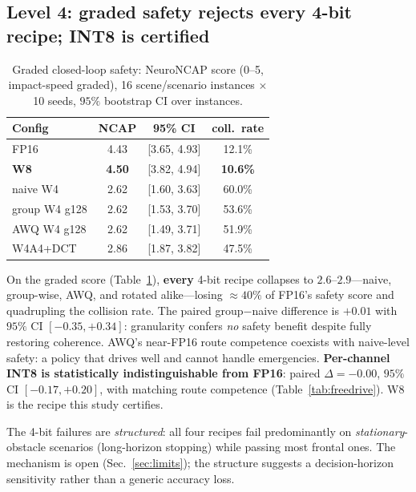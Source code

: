 \documentclass[conference]{IEEEtran}
\begin{document}
\subsection{Level 4: graded safety rejects every 4-bit recipe; INT8 is certified}
\label{sec:safety}
\begin{table}[t]\centering
\caption{Graded closed-loop safety: NeuroNCAP score (0--5, impact-speed graded), 16
scene/scenario instances $\times$ 10 seeds, $95\%$ bootstrap CI over instances.}
\label{tab:safety}
\begin{tabular}{lccc}
\toprule
Config & NCAP & 95\% CI & coll.\ rate \\
\midrule
FP16              & 4.43 & [3.65, 4.93] & 12.1\% \\
\textbf{W8}       & \textbf{4.50} & [3.82, 4.94] & \textbf{10.6\%} \\
naive W4          & 2.62 & [1.60, 3.63] & 60.0\% \\
group W4 g128     & 2.62 & [1.53, 3.70] & 53.6\% \\
AWQ W4 g128       & 2.62 & [1.49, 3.71] & 51.9\% \\
W4A4+DCT          & 2.86 & [1.87, 3.82] & 47.5\% \\
\bottomrule
\end{tabular}
\end{table}
On the graded score (Table~\ref{tab:safety}), \textbf{every} 4-bit recipe collapses to
$2.6$--$2.9$---naive, group-wise, AWQ, and rotated alike---losing $\approx40\%$ of FP16's
safety score and quadrupling the collision rate. The paired group$-$naive difference is
$+0.01$ with $95\%$ CI $[-0.35,+0.34]$: granularity confers \emph{no} safety benefit despite
fully restoring coherence. AWQ's near-FP16 route competence coexists with naive-level
safety: a policy that drives well and cannot handle emergencies.
\textbf{Per-channel INT8 is statistically indistinguishable from FP16}: paired
$\Delta=-0.00$, $95\%$ CI $[-0.17,+0.20]$, with matching route competence
(Table~\ref{tab:freedrive}). W8 is the recipe this study certifies.

The 4-bit failures are \emph{structured}: all four recipes fail predominantly on
\emph{stationary}-obstacle scenarios (long-horizon stopping) while passing most frontal
ones. The mechanism is open (Sec.~\ref{sec:limits}); the structure suggests a
decision-horizon sensitivity rather than a generic accuracy loss.
\end{document}
